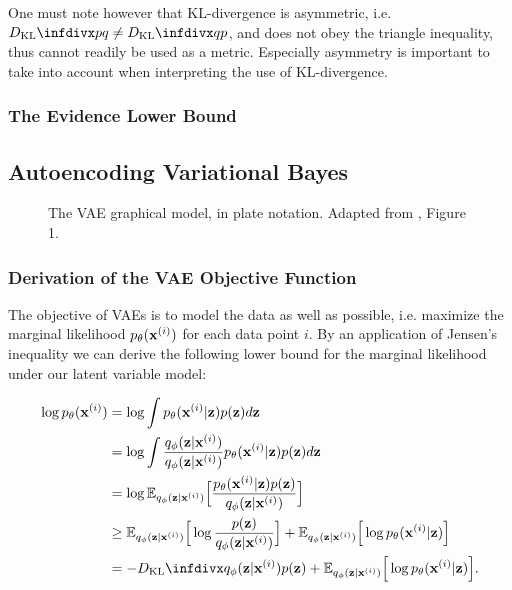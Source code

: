 One must note however that KL-divergence is asymmetric, i.e. $\dkl{p}{q} \neq \dkl{q}{p}$, and does not obey the triangle inequality, thus cannot readily be used as a metric. Especially asymmetry is important to take into account when interpreting the use of KL-divergence.

\subsubsection{The Evidence Lower Bound}

\subsection{Autoencoding Variational Bayes}

\begin{figure}[!htb]
  \centering
  \resizebox{0.3\textwidth}{!}{\unskip}
  \caption{The VAE graphical model, in plate notation. Adapted from \cite{aevb}, Figure 1.}
  \label{fig:aevb_plate_notation}
\end{figure}

\subsubsection{Derivation of the VAE Objective Function}

The objective of VAEs is to model the data as well as possible, i.e. maximize the marginal likelihood $p_{\mathbf{\theta}}(\mathbf{x}^{(i)})$ for each data point $i$. By an application of Jensen's inequality we can derive the following lower bound for the marginal likelihood under our latent variable model:

\begin{equation}
\begin{aligned}
\log \ptheta(\bxi) & = \log \int \ptheta(\bxi \vert \bz) p(\bz) d\bz \\
                   & = \log \int \frac{\qphi(\bz \vert \bxi)}{\qphi(\bz \vert \bxi)} \ptheta(\bxi \vert \bz) p(\bz) d\bz \\
                   & = \log \mathbb{E}_{\qphi(\bz \vert \bxi)}\Big[\frac{\ptheta(\bxi \vert \bz) p(\bz)}{\qphi(\bz \vert \bxi)}\Big] \\
                   & \geq \mathbb{E}_{\qphi(\bz \vert \bxi)}\Big[\log \frac{p(\bz)}{\qphi(\bz \vert \bxi)}\Big] + \mathbb{E}_{\qphi(\bz \vert \bxi)}\Big[\log \ptheta(\bxi \vert \bz)\Big] \\
                   & = -\dkl{\qphi(\bz \vert \bxi)}{p(\bz)} + \mathbb{E}_{\qphi(\bz \vert \bxi)}\Big[\log \ptheta(\bxi \vert \bz)\Big].
\end{aligned}
\end{equation}

